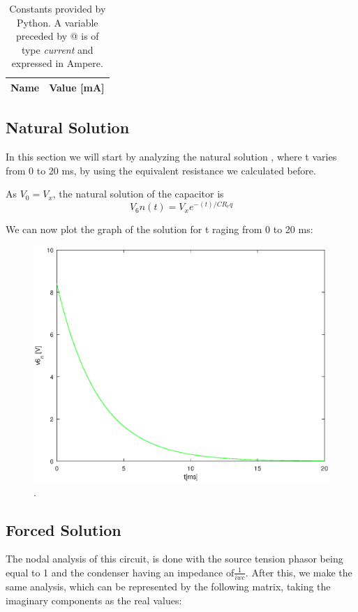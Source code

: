 \begin{table}[H]
	\centering
	\begin{tabular}{|l|r|}
		\hline    
		{\bf Name} & {\bf Value [mA]} \\ \hline
		
	\end{tabular}
	\caption{Constants provided by Python. A variable preceded by @ is of type {\em current}
		and expressed in Ampere.}
	\label{tab:op4}
\end{table}


\subsection{Natural Solution}

In this section we will start by analyzing the natural solution , where t varies from 0 to 20 ms, by using the equivalent resistance we calculated before.

As $V_0 = V_x$, the natural solution of the capacitor is  
\begin{equation}
	V_6n(t) = V_xe^{-(t)/CR_eq}
\end{equation}

We can now plot the graph of the solution for t raging from 0 to 20 ms:

\begin{figure}[H] \centering
\includegraphics[width=0.6\linewidth]{natural.eps}
\caption{.}
\label{fig:rc1}
\end{figure}
	
\subsection{Forced Solution}

The nodal analysis of this circuit, is done with the source tension phasor being equal to 1 and the condenser having an impedance of$\frac{1}{iwc}$.
After this, we make the same analysis, which can be represented by the following matrix, taking the imaginary components as the real values:

